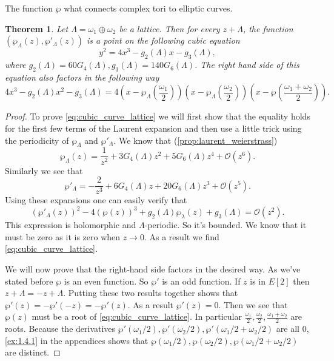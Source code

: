 \documentclass[a4paper]{article}
\theoremstyle{theoremdd}
\newtheorem{theorem}{Theorem}[section]
\theoremstyle{definitiondd}
\theoremstyle{remarkdd}
\begin{document}
The function $\wp$ what connects complex tori to elliptic curves. 
\begin{theorem}\label{thm:complex_tori_elliptic_curves}
	Let $\Lambda = \omega_1 \oplus \omega_2$ be a lattice. Then for every $z + \Lambda$, the function  $(\wp_\Lambda(z), \wp'_\Lambda(z))$ is a point on the following cubic equation \begin{equation} \label{eq:cubic_curve_lattice}
		y^2 = 4x^3 - g_2(\Lambda)x - g_{3}(\Lambda)
	,\end{equation}
	where $g_2(\Lambda) = 60 G_4(\Lambda), g_3(\Lambda) = 140 G_6(\Lambda)$.
	The right hand side of this equation also factors in the following way \[
		4x^3 - g_2(\Lambda) x^2 - g_3(\Lambda) = 4\left(x - \wp_\Lambda\left(\frac{\omega_1}{2}\right)\right)\left(x - \wp_{\Lambda}\left(\frac{\omega_2}{2}\right)\right)\left(x - \wp\left(\frac{\omega_1 + \omega_2}{2}\right)\right)
	.\] 
\end{theorem}
\begin{proof}
	To prove \cref{eq:cubic_curve_lattice} we will first show that the equality holds for the first few terms of the Laurent expansion and then use a little trick using the periodicity of $\wp_\Lambda$ and $\wp'_\Lambda$.
	We know that (\cref{prop:laurent_weierstrass})\[
		\wp_\Lambda(z) = \frac{1}{z^2} + 3 G_4(\Lambda) z^2 + 5G_6(\Lambda) z^{4} + \mathcal{O} (z^{6})
	.\] 
	Similarly we see that \[
		\wp'_\Lambda = - \frac{2}{z^3} + 6 G_4(\Lambda)z + 20G_6(\Lambda)z^3 + \mathcal{O} (z^{5})	
	.\] 
	Using these expansions one can easily verify that \[
		(\wp'_\Lambda(z))^2 - 4(\wp(z))^3 + g_2(\Lambda)\wp_{\lambda}(z) + g_{3}(\Lambda)    = \mathcal{O} (z^{2})
	.\] 
	This expression is holomorphic and $\Lambda$-periodic. So it's bounded. We know that it must be zero as it is zero when  $z \to 0$. 
	As a result we find \cref{eq:cubic_curve_lattice}.

	We will now prove that the right-hand side factors in the desired way.
	As we've stated before $\wp$ is an even function. So $\wp'$ is an odd function. 
	If $z$ is in $E[2]$ then  $z + \Lambda = - z + \Lambda$. 
	Putting these two results together shows that $\wp'(z) = - \wp'(-z) = -\wp'(z)$.  
	As a result $\wp'(z) = 0$.
	Then we see that $\wp(z)$ must be a root of \cref{eq:cubic_curve_lattice}. 
	In particular  $\frac{\omega_1}{2}, \frac{\omega_2}{2}, \frac{\omega_1 + \omega_2}{2}$ are roots. 
	Because the derivatives $\wp'(\omega_1 / 2 ), \wp'(\omega_2 / 2), \wp'(\omega_1 / 2 + \omega_2 /2)$ are all $0$, \cref{ex:1.4.1} in the appendices shows that $\wp(\omega_1 / 2), \wp(\omega_2 / 2), \wp(\omega_1 / 2 + \omega_2 / 2)$ are distinct.
\end{proof}
\end{document}
